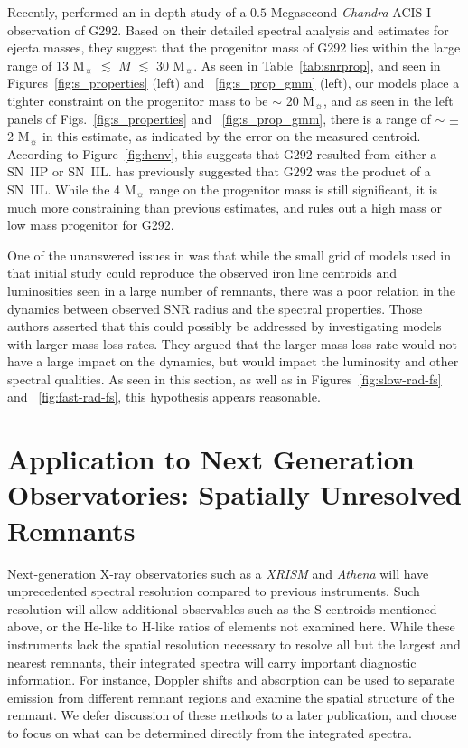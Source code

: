 \documentclass[twocolumn]{aastex631}
\begin{document}
Recently, \citet{bhalerao19} performed an in-depth study of a $0.5$ Megasecond {\it Chandra}
ACIS-I observation of G292. Based on their detailed spectral analysis and estimates for
ejecta masses, they suggest that the progenitor mass of G292 lies within the large range
of 13 M$_{\sun}$ $\lesssim$ $M$ $\lesssim$ 30 M$_{\sun}$. As seen in Table~\ref{tab:snrprop}, and seen in  Figures~\ref{fig:s_properties} (left) and ~\ref{fig:s_prop_gmm} (left), our models place a tighter constraint on the progenitor mass to be $\sim$ 20 M$_{\sun}$, and as seen in the left panels of Figs.~\ref{fig:s_properties} and ~\ref{fig:s_prop_gmm}, there is a range of $\sim$ $\pm$ 2 M$_{\sun}$ in this estimate, as indicated by the error on the measured  centroid. According to Figure~\ref{fig:henv}, this suggests that G292 resulted from either a SN~IIP or SN~IIL. \citet{chevalier05} has previously suggested that G292 was the product of a SN~IIL. While the 4 M$_{\sun}$ range on the progenitor mass is still significant, it is much more constraining than previous estimates, and rules out a high mass or low mass progenitor for G292.


One of the unanswered issues in \citet{pat15} was that while the small grid of models used in that initial study could reproduce the observed iron line centroids and luminosities seen in a large number of remnants, there was a poor relation in the dynamics between observed SNR radius and the spectral properties. Those authors asserted that this could possibly be addressed by investigating models with larger mass loss rates. They argued that the larger mass loss rate would not have a large impact on the dynamics, but would impact the luminosity and
other spectral qualities. As seen in this section, as well as in Figures~\ref{fig:slow-rad-fs} and ~\ref{fig:fast-rad-fs}, this hypothesis appears reasonable. 

\section{Application to Next Generation Observatories: Spatially Unresolved Remnants}
\label{unresolved}
Next-generation X-ray observatories such as a \textit{XRISM} and \textit{Athena} will have unprecedented spectral resolution compared to previous instruments. Such resolution will allow additional observables such as the S centroids mentioned above, or the He-like to H-like ratios of elements not examined here. While these instruments lack the spatial resolution necessary to resolve all but the largest and nearest remnants, their integrated spectra will carry important diagnostic information. For instance, Doppler shifts and absorption can be used to separate emission from different remnant regions and examine the spatial structure of the remnant. We defer discussion of these methods to a later publication, and choose to focus on what can be determined directly from the integrated spectra. 
\end{document}
